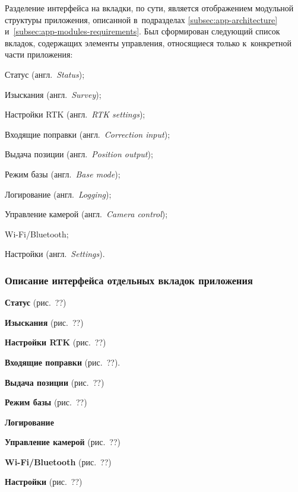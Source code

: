 Разделение интерфейса на вкладки, по сути, является отображением модульной структуры приложения, описанной в~подразделах \ref{subsec:app-architecture} и~\ref{subsec:app-modules-requirements}. Был сформирован следующий список вкладок, содержащих элементы управления, относящиеся только к~конкретной части приложения:

\begin{dashitemize}
  \item Статус (англ.~\emph{Status});
  \item Изыскания (англ.~\emph{Survey});
  \item Настройки RTK (англ.~\emph{RTK settings});
  \item Входящие поправки (англ.~\emph{Correction input});
  \item Выдача позиции (англ.~\emph{Position output});
  \item Режим базы (англ.~\emph{Base mode});
  \item Логирование (англ.~\emph{Logging});
  \item Управление камерой (англ.~\emph{Camera control});
  \item Wi-Fi/Bluetooth;
  \item Настройки (англ.~\emph{Settings}).
\end{dashitemize}

\subsubsection{Описание интерфейса отдельных вкладок приложения}
\label{subsec:app-sketch-tabs}

\begin{dashitemize}
  \item \textbf{Статус} (рис.~??)

  \item \textbf{Изыскания} (рис.~??)

  \item \textbf{Настройки RTK} (рис.~??)

  \item \textbf{Входящие поправки} (рис.~??).

  \item \textbf{Выдача позиции} (рис.~??)

  \item \textbf{Режим базы} (рис.~??)

  \item \textbf{Логирование}

  \item \textbf{Управление камерой} (рис.~??)

  \item \textbf{Wi-Fi/Bluetooth} (рис.~??)

  \item \textbf{Настройки} (рис.~??)
\end{dashitemize}

\newpage
